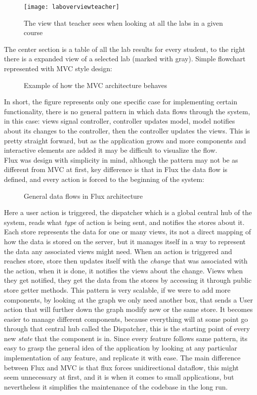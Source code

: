 \begin{figure}[h]
  {\texttt{[image: laboverviewteacher]}}
  \caption{The view that teacher sees when looking at all the labs in a given course}
  \label{fig:laboverwievteacher}
\end{figure}
The center section is a table of all the lab results for every student, to the right there is a expanded view of a selected lab (marked with gray).
Simple flowchart represented with MVC style design:
\begin{figure}[h]
\centering

\caption{Example of how the MVC architecture behaves}
\end{figure}
In short, the figure represents only one specific case for implementing certain functionality, there is no general pattern in which data flows through the system, in this case: views signal controller, controller updates model, model notifies about its changes to the controller, then the controller updates the views. This is pretty straight forward, but as the application grows and more components and interactive elements are added it may be difficult to visualize the flow.
\\Flux was design with simplicity in mind, although the pattern may not be as different from MVC at first, key difference is that in Flux the data flow is defined, and every action is forced to the beginning of the system:
\begin{figure}[h]
\centering
\scalebox{0.9}{}
\caption{General data flows in Flux architecture}
\end{figure}
Here a user action is triggered, the dispatcher which is a global central hub of the system, reads what \emph{type} of action is being sent, and notifies the stores about it. Each store represents the data for one or many views, its not a direct mapping of how the data is stored on the server, but it manages itself in a way to represent the data any associated views might need. When an action is triggered and reaches store, store then updates itself with the \emph{change} that was associated with the action, when it is done, it notifies the views about the change. Views when they get notified, they get the data from the stores by accessing it through public store getter methods.
This pattern is very scalable, if we were to add more components, by looking at the graph we only need another box, that sends a User action that will further down the graph modify new or the same store. It becomes easier to manage different components, because everything will at some point go through that central hub called the Dispatcher, this is the starting point of every new \emph{state} that the component is in. Since every feature follows same pattern, its easy to grasp the general idea of the application by looking at any particular implementation of any feature, and replicate it with ease. The main difference between Flux and MVC is that flux forces unidirectional dataflow, this might seem unnecessary at first, and it is when it comes to small applications, but nevertheless it simplifies the maintenance of the codebase in the long run.

